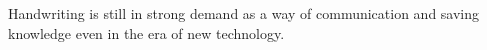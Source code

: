 Handwriting is still in strong demand as a way of communication and saving knowledge
even in the era of new technology.
